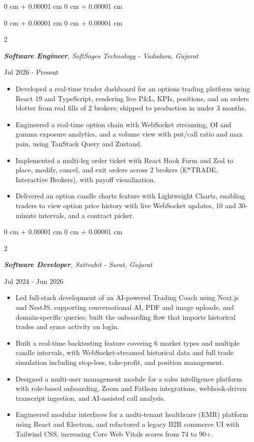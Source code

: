 \documentclass[10pt, letterpaper]{article}
\newenvironment{highlights}{
    \begin{itemize}[
        topsep=0.10 cm,
        parsep=0.10 cm,
        partopsep=0pt,
        itemsep=0pt,
        leftmargin=0 cm + 10pt
    ]
}{
    \end{itemize}
} %
\newenvironment{onecolentry}{
    \begin{adjustwidth}{
        0 cm + 0.00001 cm
    }{
        0 cm + 0.00001 cm
    }
}{
    \end{adjustwidth}
} %
\newenvironment{twocolentry}[2][]{
    \onecolentry
    \def\secondColumn{#2}
    \setcolumnwidth{\fill, 4.5 cm}
    \begin{paracol}{2}
}{
    \switchcolumn \raggedleft \secondColumn
    \end{paracol}
    \endonecolentry
} %
\begin{document}
\vspace{0.10 cm}
\begin{onecolentry}
    \begin{twocolentry}{
            Jul 2026 - Present
        }
        \textit{\textbf{Software Engineer}, SoftSages Technology - Vadodara, Gujarat}
    \end{twocolentry}
    \begin{highlights}
        \item Developed a real-time trader dashboard for an options trading platform using React 19 and TypeScript, rendering live P\&L, KPIs, positions, and an orders blotter from real fills of 2 brokers; shipped to production in under 3 months.
        \item Engineered a real-time option chain with WebSocket streaming, OI and gamma exposure analytics, and a volume view with put/call ratio and max pain, using TanStack Query and Zustand.
        \item Implemented a multi-leg order ticket with React Hook Form and Zod to place, modify, cancel, and exit orders across 2 brokers (E*TRADE, Interactive Brokers), with payoff visualization.
        \item Delivered an option candle charts feature with Lightweight Charts, enabling traders to view option price history with live WebSocket updates, 10 and 30-minute intervals, and a contract picker.
    \end{highlights}

    \vspace{0.10 cm}

    \begin{twocolentry}{
            Jul 2024 - Jun 2026
        }
        \textit{\textbf{Software Developer}, Sattvabit - Surat, Gujarat}
    \end{twocolentry}
    \begin{highlights}
        \item Led full-stack development of an AI-powered Trading Coach using Next.js and NestJS, supporting conversational AI, PDF and image uploads, and domain-specific queries; built the onboarding flow that imports historical trades and syncs activity on login.
        \item Built a real-time backtesting feature covering 6 market types and multiple candle intervals, with WebSocket-streamed historical data and full trade simulation including stop-loss, take-profit, and position management.
        \item Designed a multi-user management module for a sales intelligence platform with role-based onboarding, Zoom and Fathom integrations, webhook-driven transcript ingestion, and AI-assisted call analysis.
        \item Engineered modular interfaces for a multi-tenant healthcare (EMR) platform using React and Electron, and refactored a legacy B2B commerce UI with Tailwind CSS, increasing Core Web Vitals scores from 74 to 90+.
    \end{highlights}
\end{onecolentry}
\end{document}
